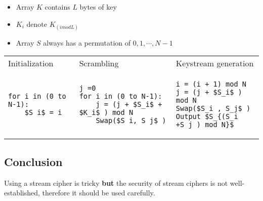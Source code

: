 \begin{itemize}
    \item Array $K$ contains $L$ bytes of key 
    \item $K_i$ denote $K_{(i mod L)}$
    \item Array $S$ always has a permutation of $0, 1, \cdots, N-1$
\end{itemize}
\begin{center}
\begin{tabular}{m{4cm}m{4cm}m{4cm}}
    Initialization & Scrambling & Keystream generation \\
    \begin{lstlisting}[mathescape]
for i in (0 to N-1):
    $S_i$ = i
    \end{lstlisting}
    &
    \begin{lstlisting}[mathescape]
j =0
for i in (0 to N-1):
    j = (j + $S_i$ + $K_i$ ) mod N
    Swap($S_i, S_j$ )
    \end{lstlisting}
    &
    \begin{lstlisting}[mathescape]
i = (i + 1) mod N
j = (j + $S_i$ ) mod N
Swap($S_i , S_j$ )
Output $S_{(S_i +S_j ) mod N}$
\end{lstlisting}
\end{tabular}
\end{center}


\subsection{Conclusion}
Using a stream cipher is tricky \textbf{but} the security of stream ciphers is not
well-established, therefore it should be used carefully.



